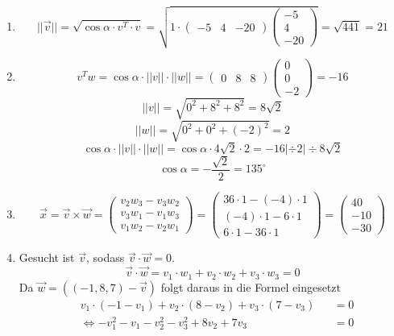 \documentclass{article}
\begin{document}
\begin{enumerate}
    \item 
    \[
    ||\overrightarrow{v}||=\sqrt{\cos{\alpha}\cdot v^T\cdot v} = 
    \sqrt{1\cdot
    \begin{pmatrix}
     -5&4&-20
    \end{pmatrix}
    \begin{pmatrix}
     -5\\4\\-20
    \end{pmatrix}}
    = \sqrt{441}=21
    \]
    
    \item
    \[
    v^Tw=\cos{\alpha}\cdot ||v||\cdot||w|| = 
    \begin{pmatrix}
     0&8&8
    \end{pmatrix}
    \begin{pmatrix}
     0\\0\\-2
    \end{pmatrix}
    = -16
    \]\[
    ||v||=\sqrt{0^2 + 8^2 + 8^2}=8\sqrt{2}
    \]\[
    ||w||= \sqrt{0^2 +0^2 +(-2)^2}=2
    \]\[
    \cos{\alpha}\cdot ||v||\cdot||w|| = \cos{\alpha}\cdot 4\sqrt{2}\cdot2 = -16 | \div 2 | \div 8\sqrt{2}
    \]\[
    \cos{\alpha} = -\frac{\sqrt{2}}{2} = 135^\circ
    \]
    
    \item 
    \[
    \overrightarrow{x}= \overrightarrow{v}\times \overrightarrow{w}=
    \begin{pmatrix}
     v_2w_3 -v_3w_2\\
     v_3w_1-v_1w_3\\
     v_1w_2-v_2w_1
    \end{pmatrix}
    =
    \begin{pmatrix}
    36\cdot1-(-4)\cdot1\\
    (-4)\cdot1-6\cdot1\\
    6\cdot1-36\cdot1
    \end{pmatrix}
    =
    \begin{pmatrix}
    40\\
    -10\\
    -30
    \end{pmatrix}
    \]
    
    \item
    Gesucht ist $\overrightarrow{v}$, sodass $\overrightarrow{v} \cdot \overrightarrow{w} = 0$.
    \[
        \overrightarrow{v} \cdot \overrightarrow{w} = v_1 \cdot w_1 + v_2 \cdot w_2 + v_3 \cdot w_3 = 0
    \]
    Da $\overrightarrow{w} = ((-1,8,7) - \overrightarrow{v})$ folgt daraus in die Formel eingesetzt
    \[
        \begin{aligned}
            &v_1 \cdot (-1 - v_1) + v_2 \cdot (8 - v_2) + v_3 \cdot (7 - v_3) &&= 0 \\
            &\Leftrightarrow -v_1^2 - v_1 - v_2^2 - v_3^2 + 8 v_2 + 7 v_3 &&= 0
        \end{aligned}
    \]
    

\end{enumerate}
\end{document}

